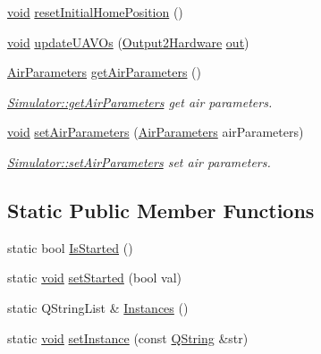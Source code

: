\begin{DoxyCompactItemize}
\item 
\hyperlink{group___u_a_v_objects_plugin_ga444cf2ff3f0ecbe028adce838d373f5c}{void} \hyperlink{group___h_i_t_l_plugin_ga23bcac84c193a077fca82e61e250b99f}{reset\-Initial\-Home\-Position} ()
\item 
\hyperlink{group___u_a_v_objects_plugin_ga444cf2ff3f0ecbe028adce838d373f5c}{void} \hyperlink{group___h_i_t_l_plugin_gad1625bf27fadfc6a51218ad76d9926a6}{update\-U\-A\-V\-Os} (\hyperlink{struct_output2_hardware}{\-Output2\-Hardware} \hyperlink{uavobjecttemplate_8m_a2a89187d8e8e8fba509ef9ab5f815d88}{out})
\item 
\hyperlink{struct_air_parameters}{\-Air\-Parameters} \hyperlink{group___h_i_t_l_plugin_ga68df0005072e39f3a7208aa63944f4dd}{get\-Air\-Parameters} ()
\begin{DoxyCompactList}\small\item\em \hyperlink{group___h_i_t_l_plugin_ga68df0005072e39f3a7208aa63944f4dd}{\-Simulator\-::get\-Air\-Parameters} get air parameters. \end{DoxyCompactList}\item 
\hyperlink{group___u_a_v_objects_plugin_ga444cf2ff3f0ecbe028adce838d373f5c}{void} \hyperlink{group___h_i_t_l_plugin_ga2425318c670bb0ddcba4dcf35f891bee}{set\-Air\-Parameters} (\hyperlink{struct_air_parameters}{\-Air\-Parameters} air\-Parameters)
\begin{DoxyCompactList}\small\item\em \hyperlink{group___h_i_t_l_plugin_ga2425318c670bb0ddcba4dcf35f891bee}{\-Simulator\-::set\-Air\-Parameters} set air parameters. \end{DoxyCompactList}\end{DoxyCompactItemize}
\subsection*{\-Static \-Public \-Member \-Functions}
\begin{DoxyCompactItemize}
\item 
static bool \hyperlink{group___h_i_t_l_plugin_gab258fc4b0cfb2d1fc7cfc2e39f12295f}{\-Is\-Started} ()
\item 
static \hyperlink{group___u_a_v_objects_plugin_ga444cf2ff3f0ecbe028adce838d373f5c}{void} \hyperlink{group___h_i_t_l_plugin_ga077a3be12724a8b465c5ed557abbca33}{set\-Started} (bool val)
\item 
static \-Q\-String\-List \& \hyperlink{group___h_i_t_l_plugin_ga7a56fe71f90b375de179eea6369025c9}{\-Instances} ()
\item 
static \hyperlink{group___u_a_v_objects_plugin_ga444cf2ff3f0ecbe028adce838d373f5c}{void} \hyperlink{group___h_i_t_l_plugin_ga8f691dedcee72e956c36f52009718cad}{set\-Instance} (const \hyperlink{group___u_a_v_objects_plugin_gab9d252f49c333c94a72f97ce3105a32d}{\-Q\-String} \&str)
\end{DoxyCompactItemize}

